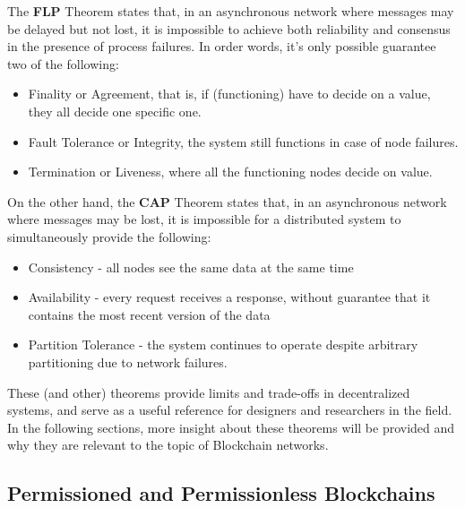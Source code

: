 % 
% 
% 
% 

The \textbf{FLP} Theorem states that, in an asynchronous network where messages may be delayed but not lost, it is impossible to achieve both reliability and consensus in the presence of process failures. In order words, it's only possible guarantee two of the following:
\begin{itemize}
    \item Finality or Agreement, that is, if (functioning) have to decide on a value, they all decide one specific one.
    \item Fault Tolerance or Integrity, the system still functions in case of node failures.
    \item Termination or Liveness, where all the functioning nodes decide on value.
\end{itemize}



On the other hand, the \textbf{CAP} Theorem states that, in an asynchronous network where messages may be lost, it is impossible for a distributed system to simultaneously provide the following:
\begin{itemize}
    \item Consistency - all nodes see the same data at the same time
    \item Availability - every request receives a response, without guarantee that it contains the most recent version of the data
    \item Partition Tolerance - the system continues to operate despite arbitrary partitioning due to network failures.
\end{itemize}


These (and other) theorems provide limits and trade-offs in decentralized systems, and serve as a useful reference for designers and researchers in the field.
In the following sections, more insight about these theorems will be provided and why they are relevant to the topic of Blockchain networks.

\subsection*{Permissioned and Permissionless Blockchains}

